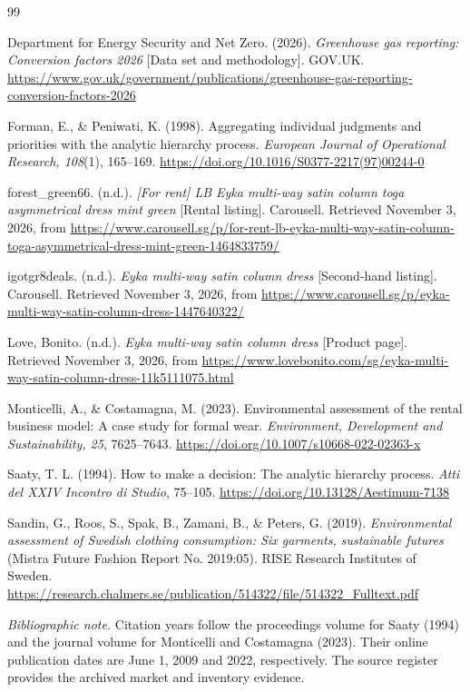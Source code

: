 \begingroup
\small
\setlength{\bibsep}{7pt}
\begin{thebibliography}{99}
\raggedright

Department for Energy Security and Net Zero. (2026). \textit{Greenhouse gas reporting: Conversion factors 2026} [Data set and methodology]. GOV.UK.
\url{https://www.gov.uk/government/publications/greenhouse-gas-reporting-conversion-factors-2026}

Forman, E., \& Peniwati, K. (1998). Aggregating individual judgments and priorities with the analytic hierarchy process. \textit{European Journal of Operational Research, 108}(1), 165--169.
\url{https://doi.org/10.1016/S0377-2217(97)00244-0}

forest\_green66. (n.d.). \textit{[For rent] LB Eyka multi-way satin column toga asymmetrical dress mint green} [Rental listing]. Carousell. Retrieved November 3, 2026, from
\url{https://www.carousell.sg/p/for-rent-lb-eyka-multi-way-satin-column-toga-asymmetrical-dress-mint-green-1464833759/}

igotgr8deals. (n.d.). \textit{Eyka multi-way satin column dress} [Second-hand listing]. Carousell. Retrieved November 3, 2026, from
\url{https://www.carousell.sg/p/eyka-multi-way-satin-column-dress-1447640322/}

Love, Bonito. (n.d.). \textit{Eyka multi-way satin column dress} [Product page]. Retrieved November 3, 2026, from
\url{https://www.lovebonito.com/sg/eyka-multi-way-satin-column-dress-11k5111075.html}

Monticelli, A., \& Costamagna, M. (2023). Environmental assessment of the rental business model: A case study for formal wear. \textit{Environment, Development and Sustainability, 25}, 7625--7643.
\url{https://doi.org/10.1007/s10668-022-02363-x}

Saaty, T. L. (1994). How to make a decision: The analytic hierarchy process. \textit{Atti del XXIV Incontro di Studio}, 75--105.
\url{https://doi.org/10.13128/Aestimum-7138}

Sandin, G., Roos, S., Spak, B., Zamani, B., \& Peters, G. (2019). \textit{Environmental assessment of Swedish clothing consumption: Six garments, sustainable futures} (Mistra Future Fashion Report No. 2019:05). RISE Research Institutes of Sweden.
\url{https://research.chalmers.se/publication/514322/file/514322_Fulltext.pdf}

\end{thebibliography}
\noindent\textit{Bibliographic note.} Citation years follow the proceedings volume for Saaty (1994) and the journal volume for Monticelli and Costamagna (2023). Their online publication dates are June 1, 2009 and 2022, respectively. The source register provides the archived market and inventory evidence.
\endgroup
